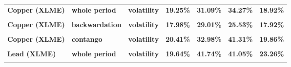 \documentclass[
  authoryear,
  preprint,
  3p]{elsarticle}
\begin{document}
\begin{longtable}[t]{>{}l>{}l>{}l>{}r>{}r>{}r>{}r}
\textbf{Copper (XLME)} & \textbf{whole period} & \textbf{volatility} & \textcolor[HTML]{4285f4}{\textbf{19.25\%}} & \textcolor[HTML]{4285f4}{\textbf{31.09\%}} & \textcolor[HTML]{4285f4}{\textbf{34.27\%}} & \textcolor[HTML]{4285f4}{\textbf{18.92\%}}\\
\textbf{\cellcolor{gray!10}{Copper (XLME)}} & \textbf{\cellcolor{gray!10}{backwardation}} & \textbf{\cellcolor{gray!10}{mean}} & \textcolor[HTML]{4285f4}{\textbf{\cellcolor{gray!10}{1.54\%}}} & \textcolor[HTML]{4285f4}{\textbf{\cellcolor{gray!10}{25.22\%}}} & \textcolor[HTML]{4285f4}{\textbf{\cellcolor{gray!10}{18.66\%}}} & \textcolor[HTML]{4285f4}{\textbf{\cellcolor{gray!10}{11.99\%}}}\\
\textbf{Copper (XLME)} & \textbf{backwardation} & \textbf{volatility} & \textcolor[HTML]{4285f4}{\textbf{17.98\%}} & \textcolor[HTML]{4285f4}{\textbf{29.01\%}} & \textcolor[HTML]{4285f4}{\textbf{25.53\%}} & \textcolor[HTML]{4285f4}{\textbf{17.92\%}}\\
\textbf{\cellcolor{gray!10}{Copper (XLME)}} & \textbf{\cellcolor{gray!10}{contango}} & \textbf{\cellcolor{gray!10}{mean}} & \textcolor[HTML]{4285f4}{\textbf{\cellcolor{gray!10}{-0.95\%}}} & \textcolor[HTML]{4285f4}{\textbf{\cellcolor{gray!10}{32\%}}} & \textcolor[HTML]{4285f4}{\textbf{\cellcolor{gray!10}{-6.78\%}}} & \textcolor[HTML]{4285f4}{\textbf{\cellcolor{gray!10}{-11.89\%}}}\\
\addlinespace
\textbf{Copper (XLME)} & \textbf{contango} & \textbf{volatility} & \textcolor[HTML]{4285f4}{\textbf{20.41\%}} & \textcolor[HTML]{4285f4}{\textbf{32.98\%}} & \textcolor[HTML]{4285f4}{\textbf{41.31\%}} & \textcolor[HTML]{4285f4}{\textbf{19.86\%}}\\
\textbf{\cellcolor{gray!10}{Lead (XLME)}} & \textbf{\cellcolor{gray!10}{whole period}} & \textbf{\cellcolor{gray!10}{mean}} & \textcolor[HTML]{4285f4}{\textbf{\cellcolor{gray!10}{3.83\%}}} & \textcolor[HTML]{4285f4}{\textbf{\cellcolor{gray!10}{28.99\%}}} & \textcolor[HTML]{4285f4}{\textbf{\cellcolor{gray!10}{10.74\%}}} & \textcolor[HTML]{4285f4}{\textbf{\cellcolor{gray!10}{2.07\%}}}\\
\textbf{Lead (XLME)} & \textbf{whole period} & \textbf{volatility} & \textcolor[HTML]{4285f4}{\textbf{19.64\%}} & \textcolor[HTML]{4285f4}{\textbf{41.74\%}} & \textcolor[HTML]{4285f4}{\textbf{41.05\%}} & \textcolor[HTML]{4285f4}{\textbf{23.26\%}}\\
\textbf{\cellcolor{gray!10}{Lead (XLME)}} & \textbf{\cellcolor{gray!10}{backwardation}} & \textbf{\cellcolor{gray!10}{mean}} & \textcolor[HTML]{4285f4}{\textbf{\cellcolor{gray!10}{7.59\%}}} & \textcolor[HTML]{4285f4}{\textbf{\cellcolor{gray!10}{11.21\%}}} & \textcolor[HTML]{4285f4}{\textbf{\cellcolor{gray!10}{9.87\%}}} & \textcolor[HTML]{4285f4}{\textbf{\cellcolor{gray!10}{17.05\%}}}\\

\end{longtable}
\end{document}
